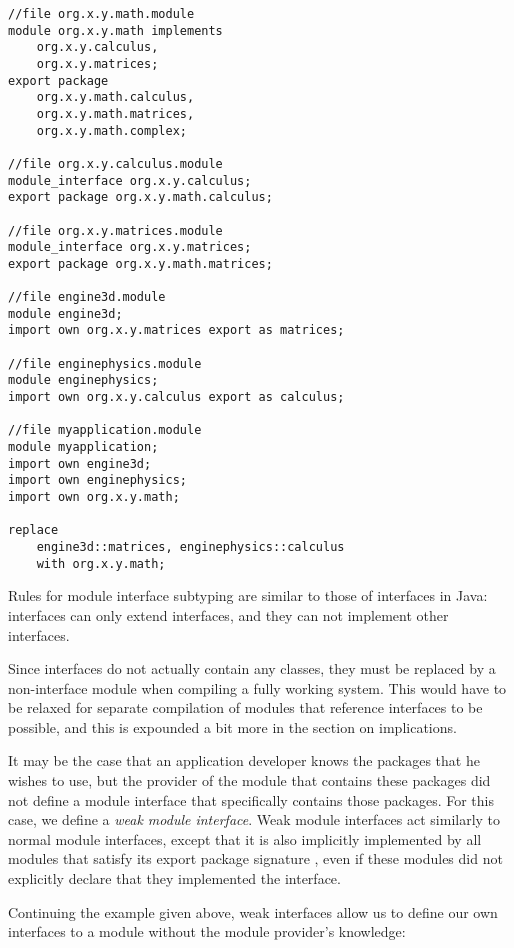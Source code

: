 \begin{lstlisting}[caption=Module Interfaces]
//file org.x.y.math.module
module org.x.y.math implements 
	org.x.y.calculus,
	org.x.y.matrices;
export package 
	org.x.y.math.calculus,
	org.x.y.math.matrices,
	org.x.y.math.complex;
	
//file org.x.y.calculus.module
module_interface org.x.y.calculus;
export package org.x.y.math.calculus;

//file org.x.y.matrices.module
module_interface org.x.y.matrices;
export package org.x.y.math.matrices;

//file engine3d.module
module engine3d;
import own org.x.y.matrices export as matrices;

//file enginephysics.module
module enginephysics;
import own org.x.y.calculus export as calculus;

//file myapplication.module
module myapplication;
import own engine3d;
import own enginephysics;
import own org.x.y.math;

replace 
	engine3d::matrices, enginephysics::calculus
	with org.x.y.math;
\end{lstlisting}

Rules for module interface subtyping are similar to those of interfaces in Java:
interfaces can only extend interfaces, and they can not implement other
interfaces. 

Since interfaces do not actually contain any classes, they must be replaced
by a non-interface module when compiling a fully working system. This would
have to be relaxed for separate compilation of modules that reference interfaces
to be possible, and this is expounded a bit more in the section on implications.


It may be the case that an application developer knows the packages that
he wishes to use, but the provider of the module that contains these packages 
did not define a module interface that specifically contains those packages. For
this case, we define a \textit{weak module interface}. Weak module interfaces act similarly
to normal module interfaces, except that it is also implicitly implemented
by all modules that satisfy its export package signature \cite{mcdirmid01jiazzi, componentnextgen}, 
even if these modules did not explicitly declare that they implemented the interface.

Continuing the example given above, weak interfaces allow us to define 
our own interfaces to a module without the module provider's knowledge:

